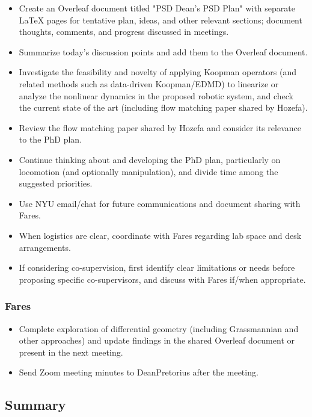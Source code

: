 \begin{itemize}
    \item Create an Overleaf document titled "PSD Dean's PSD Plan" with separate LaTeX pages for tentative plan, ideas, and other relevant sections; document thoughts, comments, and progress discussed in meetings.
    \item Summarize today's discussion points and add them to the Overleaf document.
    \item Investigate the feasibility and novelty of applying Koopman operators (and related methods such as data-driven Koopman/EDMD) to linearize or analyze the nonlinear dynamics in the proposed robotic system, and check the current state of the art (including flow matching paper shared by Hozefa).
    \item Review the flow matching paper shared by Hozefa and consider its relevance to the PhD plan.
    \item Continue thinking about and developing the PhD plan, particularly on locomotion (and optionally manipulation), and divide time among the suggested priorities.
    \item Use NYU email/chat for future communications and document sharing with Fares.
    \item When logistics are clear, coordinate with Fares regarding lab space and desk arrangements.
    \item If considering co-supervision, first identify clear limitations or needs before proposing specific co-supervisors, and discuss with Fares if/when appropriate.
\end{itemize}

\subsubsection{Fares}

\begin{itemize}
    \item Complete exploration of differential geometry (including Grassmannian and other approaches) and update findings in the shared Overleaf document or present in the next meeting.
    \item Send Zoom meeting minutes to DeanPretorius after the meeting.
\end{itemize}

\subsection{Summary}

